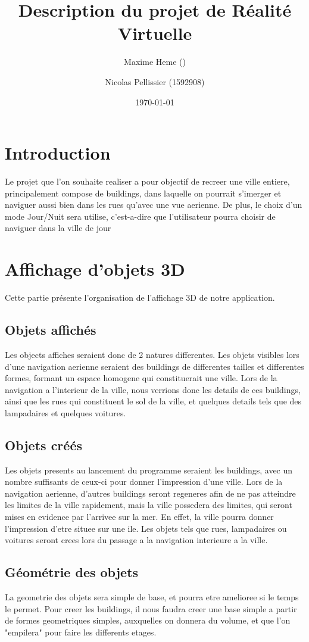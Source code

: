 \documentclass[a4paper,11pt]{article}
\title{Description du projet de Réalité Virtuelle}
\date{\today}
\author{Maxime Heme ()  \and Nicolas Pellissier (1592908)}
\begin{document}
\maketitle
\section*{Introduction}
Le projet que l'on souhaite realiser a pour objectif de recreer une ville entiere, principalement compose de buildings, dans laquelle on pourrait s'imerger et naviguer aussi bien dans les rues qu'avec une vue aerienne.
De plus, le choix d'un mode Jour/Nuit sera  utilise, c'est-a-dire que l'utilisateur pourra choisir de naviguer dans la ville de jour

\section {Affichage d'objets 3D}

Cette partie présente l'organisation de l'affichage 3D de notre application.
\subsection{Objets affichés}
Les objects affiches seraient donc de 2 natures differentes. Les objets visibles lors d'une navigation aerienne seraient des buildings de differentes tailles et differentes formes, formant un espace homogene qui constituerait une ville.
Lors de la navigation a l'interieur de la ville, nous verrions donc les details de ces buildings, ainsi que les rues qui constituent le sol de la ville, et quelques details tels que des lampadaires et quelques voitures. 

\subsection{Objets créés}
Les objets presents au lancement du programme seraient les buildings, avec un nombre suffisants de ceux-ci pour donner l'impression d'une ville. 
Lors de la navigation aerienne, d'autres buildings seront regeneres afin de ne pas atteindre les limites de la ville rapidement, mais la ville possedera des limites, qui seront mises en evidence par l'arrivee sur la mer. En effet, la ville pourra donner l'impression d'etre situee sur une ile.
Les objets tels que rues, lampadaires ou voitures seront crees lors du passage a la navigation interieure a la ville.

\subsection{Géométrie des objets}
La geometrie des objets sera simple de base, et pourra etre amelioree si le temps le permet. Pour creer les buildings, il nous faudra creer une base simple a partir de formes geometriques simples, auxquelles on donnera du volume, et que l'on "empilera" pour faire les differents etages.
\end{document}
